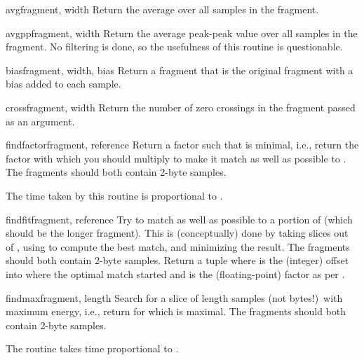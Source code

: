 \begin{funcdesc}{avg}{fragment, width}
Return the average over all samples in the fragment.
\end{funcdesc}

\begin{funcdesc}{avgpp}{fragment, width}
Return the average peak-peak value over all samples in the fragment.
No filtering is done, so the usefulness of this routine is
questionable.
\end{funcdesc}

\begin{funcdesc}{bias}{fragment, width, bias}
Return a fragment that is the original fragment with a bias added to
each sample.
\end{funcdesc}

\begin{funcdesc}{cross}{fragment, width}
Return the number of zero crossings in the fragment passed as an
argument.
\end{funcdesc}

\begin{funcdesc}{findfactor}{fragment, reference}
Return a factor  such that
 is
minimal, i.e., return the factor with which you should multiply
 to make it match as well as possible to
.  The fragments should both contain 2-byte samples.

The time taken by this routine is proportional to
.
\end{funcdesc}

\begin{funcdesc}{findfit}{fragment, reference}
Try to match  as well as possible to a portion of
 (which should be the longer fragment).  This is
(conceptually) done by taking slices out of , using
 to compute the best match, and minimizing the
result.  The fragments should both contain 2-byte samples.  Return a
tuple  where  is the
(integer) offset into  where the optimal match started
and  is the (floating-point) factor as per
.
\end{funcdesc}

\begin{funcdesc}{findmax}{fragment, length}
Search  for a slice of length  samples (not
bytes!)\ with maximum energy, i.e., return  for which
 is maximal.  The fragments
should both contain 2-byte samples.

The routine takes time proportional to .
\end{funcdesc}

